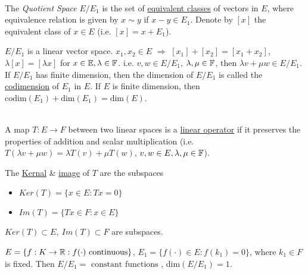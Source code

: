 \begin{definition}\ \\
The \textit{Quotient Space} $E / E_1$ is the set of \underline{equivalent classes} of vectors in $E$, where equivalence relation is given by $x \sim y$ if $x- y \in E_1$. Denote by $[x]$ the equivalent class of $x \in E$ (i.e. $[x] = x + E_1$).
\end{definition}

\begin{remark}
$E/E_1$ is a linear vector space. $x_1,x_2 \in E$ $\Rightarrow$ $[x_1] + [x_2] = [x_1 + x_2]$, $\lambda [x] = [\lambda x]$ for $x \in \mathbb{E}, \lambda \in \mathbb{F}$. i.e. $v,w \in E/E_1$, $\lambda,\mu \in \mathbb{F}$, then $\lambda v + \mu w \in E/E_1$. If $E/E_1$ has finite dimension, then the dimension of $E/E_1$ is called the \underline{codimension} of $E_1$ in $E$. If $E$ is finite dimension, then $\text{codim}(E_1) + \text{dim}(E_1) = \text{dim}(E)$.
\end{remark}

\begin{definition}\ \\
A map $T: E \to F$ between two linear spaces is a \underline{linear operator} if it preserves the properties of addition and scalar multiplication (i.e. $T(\lambda v + \mu w) = \lambda T(v) + \mu T(w)$, $v,w \in E, \lambda,\mu \in \mathbb{F}$).
\end{definition}
\noindent The \underline{Kernal} \& \underline{image} of $T$ are the subspaces
\begin{itemize}
    \item $Ker(T) = \{x \in E: Tx = 0\}$
    \item $Im(T) = \{Tx \in F: x \in E\}$
\end{itemize}
$Ker(T) \subset E,\ Im(T) \subset F$ are subspaces.

\begin{example}
$E = \{f: K \to \mathbb{R}: f(\cdot) \text{ continuous}\}$, $E_1 = \{f(\cdot) \in E: f(k_1) = 0\}$, where $k_1 \in F$ is fixed. Then $E/E_1 = \text{ constant functions }$, $\text{dim}(E/E_1) = 1$.
\end{example}

